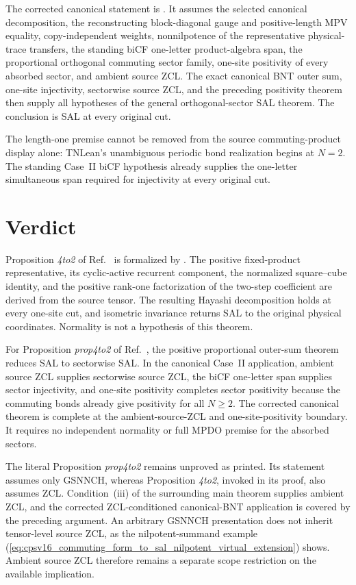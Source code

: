\documentclass{article}
\begin{document}
The corrected canonical statement is
.
It assumes the selected canonical decomposition, the reconstructing
block-diagonal gauge and positive-length MPV equality, copy-independent
weights, nonnilpotence of the representative physical-trace transfers, the
standing biCF one-letter product-algebra span, the proportional orthogonal
commuting sector family, one-site positivity of every absorbed sector, and
ambient source ZCL. The exact canonical BNT outer sum, one-site injectivity,
sectorwise source ZCL, and the preceding positivity theorem then supply all
hypotheses of the general orthogonal-sector SAL theorem. The conclusion is SAL
at every original cut.

The length-one premise cannot be removed from the source commuting-product
display alone: TNLean's unambiguous periodic bond realization begins at
$N=2$. The standing Case~II biCF hypothesis already supplies the one-letter
simultaneous span required for injectivity at every original cut.

\section{Verdict}

Proposition \emph{4to2} of Ref.~\cite{Cirac2016MPDO_arXiv} is formalized by
. The positive
fixed-product representative, its cyclic-active recurrent component, the
normalized square--cube identity, and the positive rank-one factorization of
the two-step coefficient are derived from the source tensor. The resulting
Hayashi decomposition holds at every one-site cut, and isometric invariance
returns SAL to the original physical coordinates. Normality is not a
hypothesis of this theorem.

For Proposition \emph{prop4to2} of Ref.~\cite{Cirac2016MPDO_arXiv}, the
positive proportional outer-sum theorem reduces SAL to sectorwise SAL. In the
canonical Case~II application, ambient source ZCL supplies sectorwise source
ZCL, the biCF one-letter span supplies sector injectivity, and one-site
positivity completes sector positivity because the commuting bonds already
give positivity for all $N\geq2$. The corrected canonical theorem is complete
at the ambient-source-ZCL and one-site-positivity boundary. It requires no
independent normality or full MPDO premise for the absorbed sectors.

The literal Proposition \emph{prop4to2} remains unproved as printed. Its
statement assumes only GSNNCH, whereas Proposition \emph{4to2}, invoked in its
proof, also assumes ZCL. Condition~(iii) of the surrounding main theorem
supplies ambient ZCL, and the corrected ZCL-conditioned canonical-BNT
application is covered by the preceding argument. An arbitrary GSNNCH
presentation does not inherit tensor-level source ZCL, as the nilpotent-summand
example
(\ref{eq:cpsv16_commuting_form_to_sal_nilpotent_virtual_extension}) shows.
Ambient source ZCL therefore remains a separate scope restriction on the
available implication.
\end{document}
